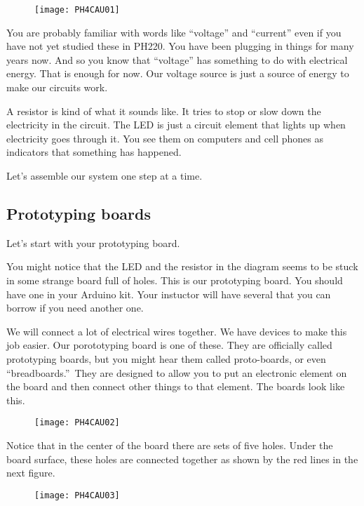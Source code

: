 \begin{figure}[h!]
	\centering
	\texttt{[image: PH4CAU01]}
\end{figure}

You are probably familiar with words like ``voltage'' and ``current'' even if  you have not yet studied these in PH220. You have been plugging in things for many years now. And so you know that ``voltage'' has
something to do with electrical energy. That is enough for now. Our voltage
source is just a source of energy to make our circuits work.

A resistor is kind of what it sounds like. It tries to stop or slow down the
electricity in the circuit. The LED is just a circuit element that lights up
when electricity goes through it. You see them on computers and cell phones
as indicators that something has happened.

Let's assemble our system one step at a time.

\subsection{Prototyping boards}

Let's start with your prototyping board.

You might notice that the LED and the resistor in the diagram seems to be
stuck in some strange board full of holes. This is our prototyping board.
You should have one in your Arduino kit. Your instuctor will have several
that you can borrow if you need another one.

We will connect a lot of electrical wires together. We have devices to make
this job easier. Our porototyping board is one of these. They are officially
called prototyping boards, but you might hear them called proto-boards, or
even \textquotedblleft breadboards.\textquotedblright\ They are designed to
allow you to put an electronic element on the board and then connect other
things to that element. The boards look like this. 

\begin{figure}[h!]
	\centering
	\texttt{[image: PH4CAU02]}
\end{figure}

Notice that in the center of the board there are sets of five holes. Under
the board surface, these holes are connected together as shown by the red
lines in the next figure. 

\begin{figure}[h!]
	\centering
	\texttt{[image: PH4CAU03]}
\end{figure} 

